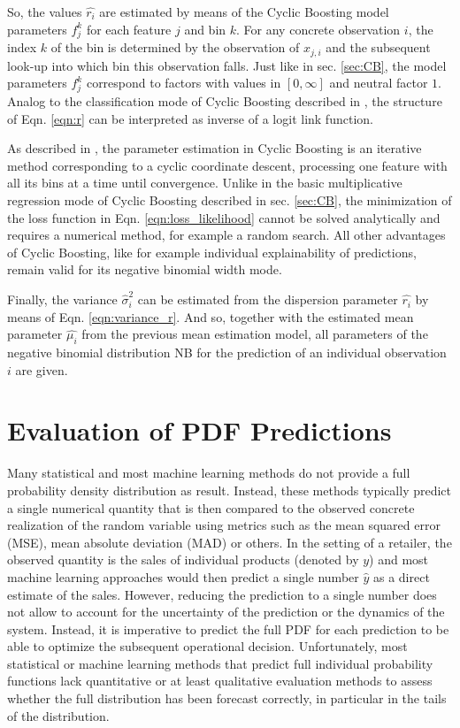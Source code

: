 \documentclass[BCOR=1mm, DIV=calc,10pt,
twoside=true,
twocolumn,
headings=normal]{scrartcl}
\newcommand{\eqn}{Eqn. }
\begin{document}
So, the values $\hat{r_i}$ are estimated by means of the Cyclic Boosting model parameters $f^k_j$ for each feature $j$ and bin $k$. For any concrete observation $i$, the index $k$ of the bin is determined by the observation of $x_{j,i}$ and the subsequent look-up into which bin this observation falls. Just like in sec. \ref{sec:CB}, the model parameters $f^k_j$ correspond to factors with values in $[0, \infty]$ and neutral factor $1$. Analog to the classification mode of Cyclic Boosting described in \cite{Wick2019}, the structure of \eqn \eqref{eqn:r} can be interpreted as inverse of a logit link function.

As described in \cite{Wick2019}, the parameter estimation in Cyclic Boosting is an iterative method corresponding to a cyclic coordinate descent, processing one feature with all its bins at a time until convergence. Unlike in the basic multiplicative regression mode of Cyclic Boosting described in sec. \ref{sec:CB}, the minimization of the loss function in \eqn \eqref{eqn:loss_likelihood} cannot be solved analytically and requires a numerical method, for example a random search. All other advantages of Cyclic Boosting, like for example individual explainability of predictions, remain valid for its negative binomial width mode.

Finally, the variance $\hat{\sigma}^2_i$ can be estimated from the dispersion parameter $\hat{r_i}$ by means of \eqn \eqref{eqn:variance_r}. And so, together with the estimated mean parameter $\hat{\mu_i}$ from the previous mean estimation model, all parameters of the negative binomial distribution NB for the prediction of an individual observation $i$ are given.


\section{Evaluation of PDF Predictions}
\label{sec:pdfEvaluation}

Many statistical and most machine learning methods do not provide a full probability density distribution as result. Instead, these methods typically predict a single numerical quantity that is then compared to the observed concrete realization of the random variable using metrics such as the mean squared error (MSE),  mean absolute deviation (MAD) or others. In the setting of a retailer, the observed quantity is the sales of individual products (denoted by $y$) and most machine learning approaches would then predict a single number $\hat{y}$ as a direct estimate of the sales. However, reducing the prediction to a single number does not allow to account for the uncertainty of the prediction or the dynamics of the system. Instead, it is imperative to predict the full PDF for each prediction to be able to optimize the subsequent operational decision. Unfortunately, most statistical or machine learning methods that predict full individual probability functions lack quantitative or at least qualitative evaluation methods to assess whether the full distribution has been forecast correctly, in particular in the tails of the distribution.
\end{document}
